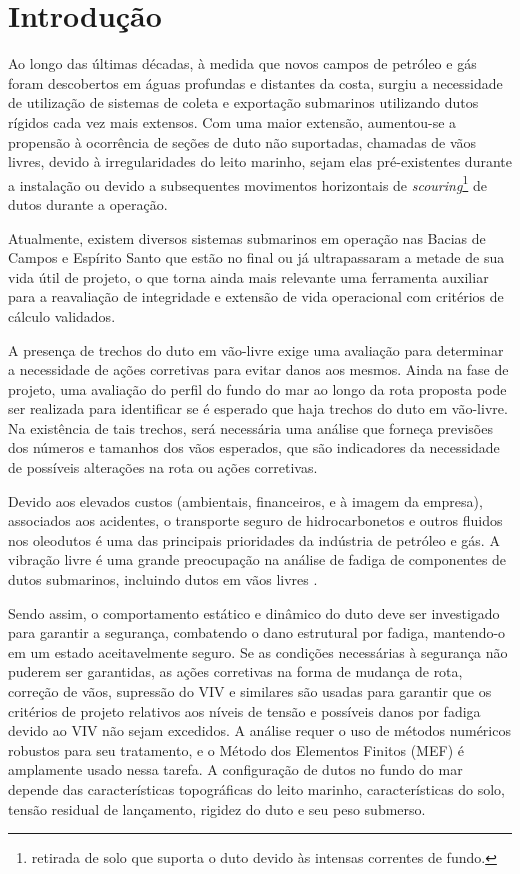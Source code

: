 \chapter{Introdução}


Ao longo das últimas décadas, à medida que novos campos de petróleo e gás foram descobertos em águas profundas e distantes da costa, surgiu a necessidade de utilização de sistemas de coleta e exportação submarinos utilizando dutos rígidos cada vez mais extensos.
Com uma maior extensão, aumentou-se a propensão à ocorrência de seções de duto não suportadas, chamadas de vãos livres, devido à irregularidades do leito marinho, sejam elas pré-existentes durante a instalação ou devido a subsequentes movimentos horizontais de \textit{scouring}\footnote{retirada de solo que suporta o duto devido às intensas correntes de fundo.} de dutos durante a operação.

Atualmente, existem diversos sistemas submarinos em operação nas Bacias de Campos e Espírito Santo que estão no final ou já ultrapassaram a metade de sua vida útil de projeto, o que torna ainda mais relevante uma ferramenta auxiliar para a reavaliação de integridade e extensão de vida operacional com critérios de cálculo validados.

A presença de trechos do duto em vão-livre exige uma avaliação para determinar a necessidade de ações corretivas para evitar danos aos mesmos.
Ainda na fase de projeto, uma avaliação do perfil do fundo do mar ao longo da rota proposta pode ser realizada para identificar se é esperado que haja trechos do duto em vão-livre.
Na existência de tais trechos, será necessária uma análise que forneça previsões dos números e tamanhos dos vãos esperados, que são indicadores da necessidade de possíveis alterações na rota ou ações corretivas.

Devido aos elevados custos (ambientais, financeiros, e à imagem da empresa), associados aos acidentes, o transporte seguro de hidrocarbonetos e outros fluidos nos oleodutos é uma das principais prioridades da indústria de petróleo e gás.
A vibração livre é uma grande preocupação na análise de fadiga de componentes de dutos submarinos, incluindo dutos em vãos livres \cite{Gamino2013}.

Sendo assim, o comportamento estático e dinâmico do duto deve ser investigado para garantir a segurança, combatendo o dano estrutural por fadiga, mantendo-o em um estado aceitavelmente seguro.
Se as condições necessárias à segurança não puderem ser garantidas, as ações corretivas na forma de mudança de rota, correção de vãos, supressão do VIV e similares são usadas para garantir que os critérios de projeto relativos aos níveis de tensão e possíveis danos por fadiga devido ao VIV não sejam excedidos.
A análise requer o uso de métodos numéricos robustos para seu tratamento, e o Método dos Elementos Finitos (MEF) é amplamente usado nessa tarefa.
A configuração de dutos no fundo do mar depende das características topográficas do leito marinho, características do solo, tensão residual de lançamento, rigidez do duto e seu peso submerso.


